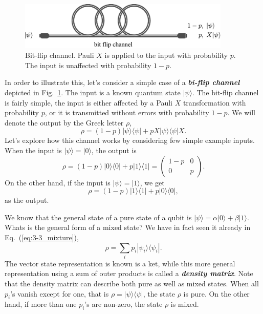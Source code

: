 \begin{figure}[t]
    \centering
    \includegraphics[width=0.9\textwidth]{lesson3/3-3_bit_flip_channel.pdf}
    \caption[Bit-flip channel]{Bit-flip channel. Pauli $X$ is applied to the input with probability $p$. The input is unaffected with probability $1-p$.}
    \label{fig:3-3_bit_flip_channel}
\end{figure}
In order to illustrate this, let's consider a simple case of a \textit{\textbf{bi-flip channel}} depicted in Fig.~\ref{fig:3-3_bit_flip_channel}.
The input is a known quantum state $|\psi\rangle$.
The bit-flip channel is fairly simple, the input is either affected by a Pauli $X$ transformation with probability $p$, or it is transmitted without errors with probability $1-p$.
We will denote the output by the Greek letter $\rho$,
\begin{equation}
    \rho = (1-p) |\psi\rangle\langle\psi| + p X|\psi\rangle\langle\psi|X.
    \label{eq:3-3_bit_flip}
\end{equation}
Let's explore how this channel works by considering few simple example inputs.
When the input is $|\psi\rangle = |0\rangle$, the output is
\begin{equation}
    \rho = (1-p)|0\rangle\langle0| + p|1\rangle\langle1| = \begin{pmatrix} 1-p & 0 \\ 0 & p \end{pmatrix}.
\end{equation}
On the other hand, if the input is $|\psi\rangle=|1\rangle$, we get
\begin{equation}
    \rho = (1-p)|1\rangle\langle1| + p|0\rangle\langle0|,
\end{equation}
as the output.

We know that the general state of a pure state of a qubit is $|\psi\rangle = \alpha|0\rangle + \beta|1\rangle$.
Whats is the general form of a mixed state?
We have in fact seen it already in Eq.~(\ref{eq:3-3_mixture}),
\begin{equation}
    \rho = \sum_i p_i |\psi_i\rangle\langle\psi_i|.
\end{equation}
The vector state representation is known is a ket, while this more general representation using a sum of outer products is called a \textit{\textbf{density matrix}}.
Note that the density matrix can describe both pure as well as mixed states.
When all $p_i$'s vanish except for one, that is $\rho=|\psi\rangle\langle\psi|$, the state $\rho$ is pure.
On the other hand, if more than one $p_i$'s are non-zero, the state $\rho$ is mixed.

